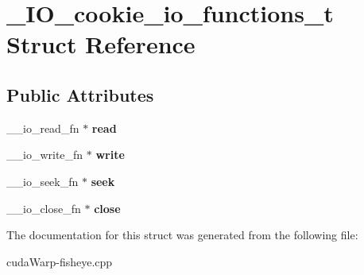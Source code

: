 \hypertarget{struct__IO__cookie__io__functions__t}{}\section{\+\_\+\+I\+O\+\_\+cookie\+\_\+io\+\_\+functions\+\_\+t Struct Reference}
\label{struct__IO__cookie__io__functions__t}
\subsection*{Public Attributes}
\begin{DoxyCompactItemize}
\item 
\+\_\+\+\_\+io\+\_\+read\+\_\+fn $\ast$ {\bfseries read}\hypertarget{struct__IO__cookie__io__functions__t_a705bf1512b9ca0458668e5705fbdd33f}{}\label{struct__IO__cookie__io__functions__t_a705bf1512b9ca0458668e5705fbdd33f}

\item 
\+\_\+\+\_\+io\+\_\+write\+\_\+fn $\ast$ {\bfseries write}\hypertarget{struct__IO__cookie__io__functions__t_aca3c5cc5a3a84d2150f0b31f9b402f54}{}\label{struct__IO__cookie__io__functions__t_aca3c5cc5a3a84d2150f0b31f9b402f54}

\item 
\+\_\+\+\_\+io\+\_\+seek\+\_\+fn $\ast$ {\bfseries seek}\hypertarget{struct__IO__cookie__io__functions__t_ad2bd0e89b4b2c228dac747f57793b4cb}{}\label{struct__IO__cookie__io__functions__t_ad2bd0e89b4b2c228dac747f57793b4cb}

\item 
\+\_\+\+\_\+io\+\_\+close\+\_\+fn $\ast$ {\bfseries close}\hypertarget{struct__IO__cookie__io__functions__t_ac9259341bcf1b767d0392f7184c68c5c}{}\label{struct__IO__cookie__io__functions__t_ac9259341bcf1b767d0392f7184c68c5c}

\end{DoxyCompactItemize}


The documentation for this struct was generated from the following file\+:\begin{DoxyCompactItemize}
\item 
cuda\+Warp-\/fisheye.\+cpp\end{DoxyCompactItemize}
